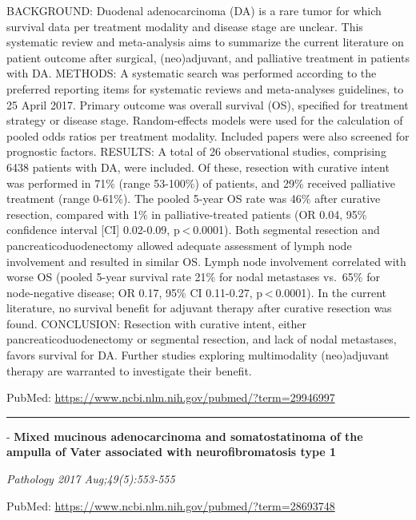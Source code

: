 \documentclass[]{article}
\begin{document}
BACKGROUND: Duodenal adenocarcinoma (DA) is a rare tumor for which
survival data per treatment modality and disease stage are unclear. This
systematic review and meta-analysis aims to summarize the current
literature on patient outcome after surgical, (neo)adjuvant, and
palliative treatment in patients with DA. METHODS: A systematic search
was performed according to the preferred reporting items for systematic
reviews and meta-analyses guidelines, to 25 April 2017. Primary outcome
was overall survival (OS), specified for treatment strategy or disease
stage. Random-effects models were used for the calculation of pooled
odds ratios per treatment modality. Included papers were also screened
for prognostic factors. RESULTS: A total of 26 observational studies,
comprising 6438 patients with DA, were included. Of these, resection
with curative intent was performed in 71\% (range 53-100\%) of patients,
and 29\% received palliative treatment (range 0-61\%). The pooled 5-year
OS rate was 46\% after curative resection, compared with 1\% in
palliative-treated patients (OR 0.04, 95\% confidence interval {[}CI{]}
0.02-0.09, p \textless{} 0.0001). Both segmental resection and
pancreaticoduodenectomy allowed adequate assessment of lymph node
involvement and resulted in similar OS. Lymph node involvement
correlated with worse OS (pooled 5-year survival rate 21\% for nodal
metastases vs.~65\% for node-negative disease; OR 0.17, 95\% CI
0.11-0.27, p \textless{} 0.0001). In the current literature, no survival
benefit for adjuvant therapy after curative resection was found.
CONCLUSION: Resection with curative intent, either
pancreaticoduodenectomy or segmental resection, and lack of nodal
metastases, favors survival for DA. Further studies exploring
multimodality (neo)adjuvant therapy are warranted to investigate their
benefit.

PubMed: \url{https://www.ncbi.nlm.nih.gov/pubmed/?term=29946997}

{}

{}

\begin{center}\rule{0.5\linewidth}{\linethickness}\end{center}

 - \textbf{Mixed mucinous adenocarcinoma and somatostatinoma of the
ampulla of Vater associated with neurofibromatosis type 1}

\emph{Pathology 2017 Aug;49(5):553-555}

PubMed: \url{https://www.ncbi.nlm.nih.gov/pubmed/?term=28693748}
\end{document}
